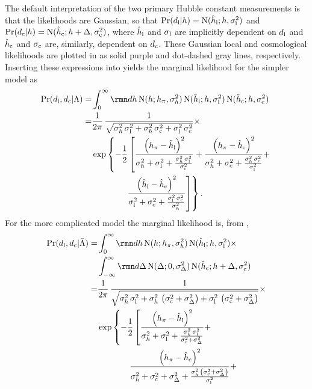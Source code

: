 \documentclass[a4paper,fleqn,usenatbib]{mnras}
\newcommand{\msame}{\Lambda}
\newcommand{\mdiff}{\bar{\Lambda}}
\newcommand{\hlobs}{\hat{h}_{\rm l}}
\newcommand{\hcobs}{\hat{h}_{\rm c}}
\newcommand{\hlerr}{\sigma_{\rm l}}
\newcommand{\hcerr}{\sigma_{\rm c}}
\newcommand{\datl}{d_{\rm l}}
\newcommand{\datc}{d_{\rm c}}
\begin{document}
{The default interpretation
of the two primary Hubble constant measurements is 
that the
likelihoods are Gaussian, so that 
$\prob(\datl | h) = \normal(\hlobs; h, \hlerr^2)$
and 
$\prob(\datc | h) = \normal(\hcobs; h + \Delta, \hcerr^2)$,
where $\hlobs$ and $\hlerr$ are implicitly dependent on $\datl$
and $\hcobs$ and $\hcerr$ are, similarly, dependent on $\datc$.
These Gaussian local and cosmological likelihoods are plotted in 
 as solid purple and dot-dashed gray lines, 
respectively. Inserting these expressions into 
yields 
the marginal likelihood for the simpler model as
\begin{align}
\prob(\datl, \datc | \msame) = & \int_0^\infty \diff h \, \normal(h; h_\pi, \sigma_h^2) \, \normal(\hlobs ; h, \hlerr^2) \, \normal(\hcobs ; h, \hcerr^2) \nonumber \\
= &
\frac{1}{2\pi} \, \frac{1}{\sqrt{\sigma_h^2 \, \hlerr^2 + \sigma_h^2 \, \hcerr^2 + \hlerr^2\, \hcerr^2}} \nonumber \times \\
  &  \exp \left\{ -\frac{1}{2} \left[ \frac{ \left( h_\pi - \hlobs \right)^2 }{ \sigma_h^2 + \hlerr^2 + \frac{ \sigma_h^2 \, \hlerr^2 }{ \hcerr^2 } } +  \frac{ \left( h_\pi - \hcobs \right)^2 }{ \sigma_h^2 + \hcerr^2 + \frac{ \sigma_h^2 \, \hcerr^2 }{ \hlerr^2 } } + \right. \right. \nonumber \\
  & \phantom{\exp \{ -\frac{1}{2} [{}} \left. \left. \frac{ \left( \hlobs - \hcobs \right)^2 }{ \hlerr^2 + \hcerr^2 + \frac{ \hlerr^2 \, \hcerr^2 }{ \sigma_h^2 } } \right] \right\}.
\end{align}
For the more complicated model the marginal likelihood is,
from ,
\begin{align}
\prob(\datl, \datc | \mdiff) = & \int_0^\infty \diff h \, \normal(h; h_\pi, \sigma_h^2) \,  \normal(\hlobs ; h, \hlerr^2) \times  \nonumber \\
  & \int_{-\infty}^\infty \diff \Delta \, \normal(\Delta; 0, \sigma_\Delta^2) \, \normal(\hcobs ; h + \Delta, \hcerr^2) \nonumber \\
= &
\frac{1}{2\pi} \, \frac{1}{\sqrt{\sigma_h^2 \, \hlerr^2 + \sigma_h^2 \, \left(\hcerr^2 + \sigma_\Delta^2 \right) + \hlerr^2\, \left(\hcerr^2 + \sigma_\Delta^2 \right)}} \nonumber \times \\
  &  \exp \left\{ -\frac{1}{2} \left[ \frac{ \left( h_\pi - \hlobs \right)^2 }{ \sigma_h^2 + \hlerr^2 + \frac{ \sigma_h^2 \, \hlerr^2 }{ \hcerr^2 + \sigma_\Delta^2 } } + \right. \right. \nonumber \\
  &  \phantom{\exp \{ -\frac{1}{2} [{}} \frac{ \left( h_\pi - \hcobs \right)^2 }{ \sigma_h^2 + \hcerr^2 + \sigma_\Delta^2 + \frac{ \sigma_h^2 \, \left(\hcerr^2 + \sigma_\Delta^2 \right) }{ \hlerr^2 } } + \nonumber \\

\end{align}}
\end{document}
